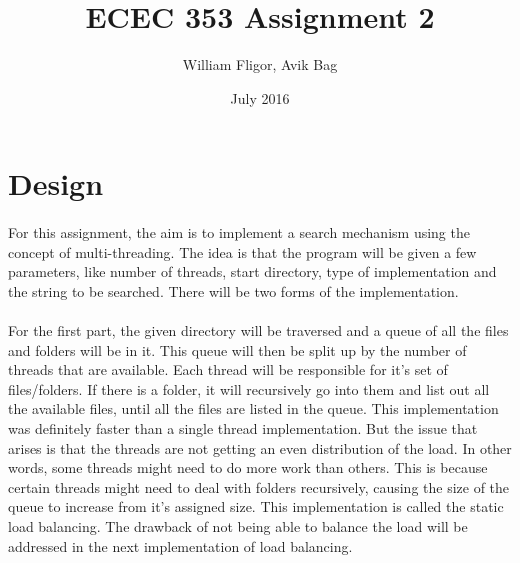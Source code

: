 \documentclass{article}
\title{ECEC 353 Assignment 2}
\author{William Fligor, Avik Bag}
\date{July 2016}
\begin{document}
\maketitle

\section{Design}
\paragraph{}
For this assignment, the aim is to implement a search mechanism using the concept of multi-threading. The idea is that the program will be given a few parameters, like number of threads, start directory, type of implementation and the string to be searched. There will be two forms of the implementation.
\paragraph{}
For the first part, the given directory will be traversed and a queue of all the files and folders will be in it. This queue will then be split up by the number of threads that are available. Each thread will be responsible for it's set of files/folders. If there is a folder, it will recursively go into them and list out all the available files, until all the files are listed in the queue. This implementation was definitely faster than a single thread implementation. But the issue that arises is that the threads are not getting an even distribution of the load. In other words, some threads might need to do more work than others. This is because certain threads might need to deal with folders recursively, causing the size of the queue to increase from it's assigned size. This implementation is called the static load balancing. The drawback of not being able to balance the load will be addressed in the next implementation of load balancing.
\end{document}

